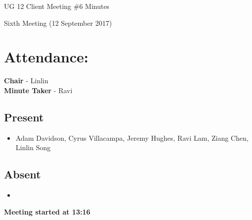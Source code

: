 \documentclass{article}
\begin{document}
\begin{adjustwidth}{2.5em}{0pt}
\begin{center}
\Large{UG 12 Client Meeting \#6  Minutes}\\
\end{center}
\end{adjustwidth}

Sixth Meeting (12 September 2017)
\section{Attendance:}
\textbf{Chair} - Linlin\\
\textbf{Minute Taker} - Ravi\\
\subsection*{Present}
\begin{itemize}
\item Adam Davidson, Cyrus Villacampa, Jeremy Hughes, Ravi Lam, Ziang Chen, Linlin Song
\end{itemize}
\subsection*{Absent}
\begin{itemize}
\item  
\end {itemize}
\textbf{Meeting started at 13:16}
\end{document}
